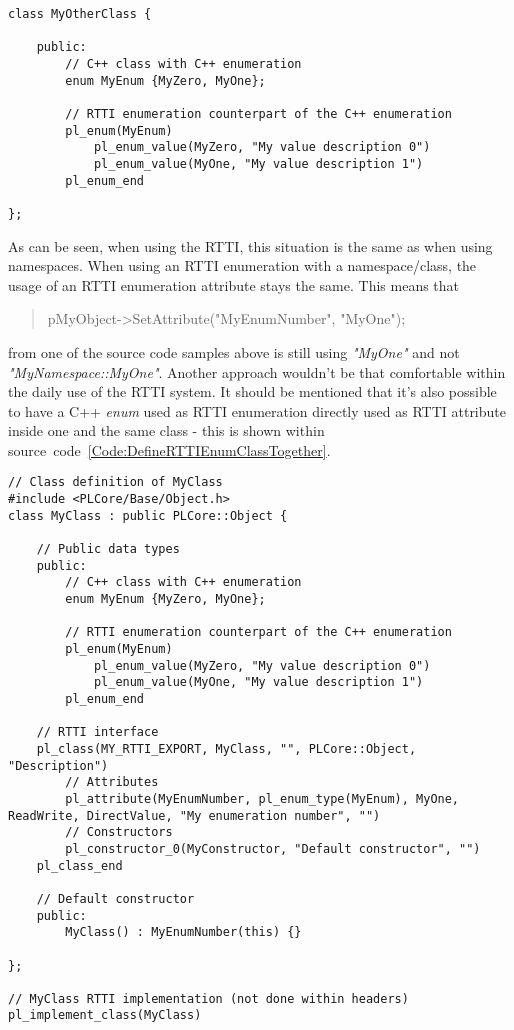\begin{lstlisting}[label=Code:DefineRTTIEnumClass,caption={Defining a new RTTI enumeration using a C++ enum inside a class}]
class MyOtherClass {

	public:
		// C++ class with C++ enumeration
		enum MyEnum {MyZero, MyOne};

		// RTTI enumeration counterpart of the C++ enumeration
		pl_enum(MyEnum)
			pl_enum_value(MyZero, "My value description 0")
			pl_enum_value(MyOne, "My value description 1")
		pl_enum_end

};
\end{lstlisting}
As can be seen, when using the RTTI, this situation is the same as when using namespaces. When using an RTTI enumeration with a namespace/class, the usage of an RTTI enumeration attribute stays the same. This means that \begin{quote}pMyObject->SetAttribute("MyEnumNumber", "MyOne");\end{quote} from one of the source code samples above is still using \emph{"MyOne"} and not \emph{"MyNamespace::MyOne"}. Another approach wouldn't be that comfortable within the daily use of the RTTI system. It should be mentioned that it's also possible to have a C++ \emph{enum} used as RTTI enumeration directly used as RTTI attribute inside one and the same class - this is shown within source~code~\ref{Code:DefineRTTIEnumClassTogether}.
\begin{lstlisting}[label=Code:DefineRTTIEnumClassTogether,caption={Defining and using a new RTTI enumeration inside one and the same class}]
// Class definition of MyClass
#include <PLCore/Base/Object.h>
class MyClass : public PLCore::Object {

	// Public data types
	public:
		// C++ class with C++ enumeration
		enum MyEnum {MyZero, MyOne};

		// RTTI enumeration counterpart of the C++ enumeration
		pl_enum(MyEnum)
			pl_enum_value(MyZero, "My value description 0")
			pl_enum_value(MyOne, "My value description 1")
		pl_enum_end

	// RTTI interface
	pl_class(MY_RTTI_EXPORT, MyClass, "", PLCore::Object, "Description")
		// Attributes
		pl_attribute(MyEnumNumber, pl_enum_type(MyEnum), MyOne, ReadWrite, DirectValue, "My enumeration number", "")
		// Constructors
		pl_constructor_0(MyConstructor, "Default constructor", "")
	pl_class_end

	// Default constructor
	public:
		MyClass() : MyEnumNumber(this) {}

};

// MyClass RTTI implementation (not done within headers)
pl_implement_class(MyClass)
\end{lstlisting}


